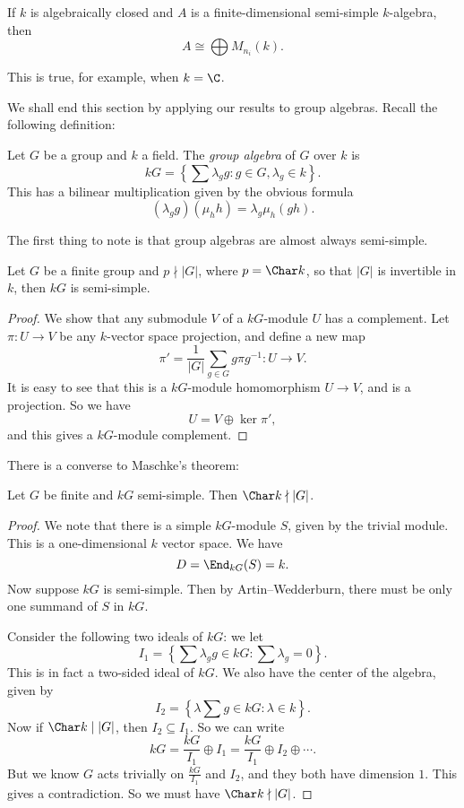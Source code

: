 \documentclass[a4paper]{article}
\begin{document}
\begin{cor}
  If $k$ is algebraically closed and $A$ is a finite-dimensional semi-simple $k$-algebra, then
  \[
    A \cong \bigoplus M_{n_i}(k).
  \]
\end{cor}
This is true, for example, when $k = \C$.

We shall end this section by applying our results to group algebras. Recall the following definition:
\begin{defi}
  Let $G$ be a group and $k$ a field. The \emph{group algebra} of $G$ over $k$ is
  \[
    kG = \left\{\sum \lambda_g g: g \in G, \lambda_g \in k\right\}.
  \]
  This has a bilinear multiplication given by the obvious formula
  \[
    (\lambda_g g) (\mu_h h) = \lambda_g \mu_h (gh).
  \]
\end{defi}

The first thing to note is that group algebras are almost always semi-simple.
\begin{thm}
  Let $G$ be a finite group and $p \nmid |G|$, where $p = \Char k$, so that $|G|$ is invertible in $k$, then $kG$ is semi-simple.
\end{thm}

\begin{proof}
  We show that any submodule $V$ of a $kG$-module $U$ has a complement. Let $\pi: U \to V$ be any $k$-vector space projection, and define a new map
  \[
    \pi' = \frac{1}{|G|} \sum_{g \in G} g\pi g^{-1}: U \to V.
  \]
  It is easy to see that this is a $kG$-module homomorphism $U \to V$, and is a projection. So we have
  \[
    U = V \oplus \ker \pi',
  \]
  and this gives a $kG$-module complement.
\end{proof}

There is a converse to Maschke's theorem:
\begin{thm}
  Let $G$ be finite and $kG$ semi-simple. Then $\Char k \nmid |G|$.
\end{thm}

\begin{proof}
  We note that there is a simple $kG$-module $S$, given by the trivial module. This is a one-dimensional $k$ vector space. We have
  \[
    D = \End_{kG}(S) = k.
  \]
  Now suppose $kG$ is semi-simple. Then by Artin--Wedderburn, there must be only one summand of $S$ in $kG$.

  Consider the following two ideals of $kG$: we let
  \[
    I_1 = \left\{\sum \lambda_g g \in kG: \sum \lambda_g = 0\right\}.
  \]
  This is in fact a two-sided ideal of $kG$. We also have the center of the algebra, given by
  \[
    I_2 = \left\{\lambda \sum g \in kG: \lambda \in k\right\}.
  \]
  Now if $\Char k \mid |G|$, then $I_2 \subseteq I_1$. So we can write
  \[
    kG = \frac{kG}{I_1} \oplus I_1 = \frac{kG}{I_1} \oplus I_2 \oplus \cdots.
  \]
  But we know $G$ acts trivially on $\frac{kG}{I_1}$ and $I_2$, and they both have dimension $1$. This gives a contradiction. So we must have $\Char k \nmid |G|$.
\end{proof}
\end{document}
